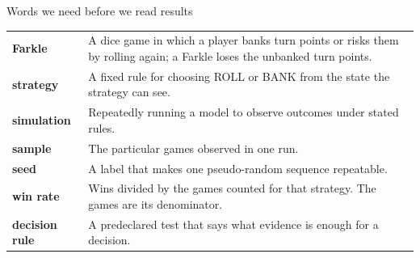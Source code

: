 \begin{frame}{Words we need before we read results}
\begin{tabular}{@{}p{3.0cm}p{10.0cm}@{}}
\textbf{Farkle} & A dice game in which a player banks turn points or risks them by rolling again; a Farkle loses the unbanked turn points.\\[2pt]
\textbf{strategy} & A fixed rule for choosing ROLL or BANK from the state the strategy can see.\\[2pt]
\textbf{simulation} & Repeatedly running a model to observe outcomes under stated rules.\\[2pt]
\textbf{sample} & The particular games observed in one run.\\[2pt]
\textbf{seed} & A label that makes one pseudo-random sequence repeatable.\\[2pt]
\textbf{win rate} & Wins divided by the games counted for that strategy. The games are its denominator.\\[2pt]
\textbf{decision rule} & A predeclared test that says what evidence is enough for a decision.
\end{tabular}
\end{frame}
